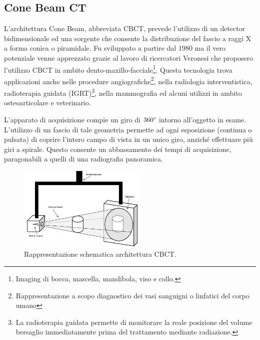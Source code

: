 \documentclass[a4paper,12pt, doubleside]{report}
\begin{document}
            \subsection{Cone Beam CT}
                \label{sec:cone-beam}
                \par
                    L'architettura Cone Beam, abbreviata CBCT, prevede l'utilizzo di un detector bidimensionale ed una sorgente che consente la distribuzione del fascio a raggi X a forma conica o piramidale. Fu sviluppato a partire dal 1980 ma il vero potenziale venne apprezzato grazie al lavoro di ricercatori Veronesi che proposero l'utilizzo CBCT in ambito dento-maxillo-facciale\footnote{Imaging di bocca, mascella, mandibola, viso e collo.}. Questa tecnologia trova applicazioni anche nelle procedure angiografiche\footnote{Rappresentazione a scopo diagnostico dei vasi sanguigni o linfatici del corpo umano}, nella radiologia interventistica, radioterapia guidata (IGRT)\footnote{La radioterapia guidata permette di monitorare la reale posizione del volume bersaglio immediatamente prima del trattamento mediante radiazione.}, nella mammografia ed alcuni utilizzi in ambito osteoarticolare e veterinario.
                
                \bigskip
                \par
                    L'apparato di acquisizione compie un giro di $360\degree$ intorno all'oggetto in esame. L'utilizzo di un fascio di tale geometria permette ad ogni esposizione (continua o pulsata) di coprire l'intero campo di vista in un unico giro, anziché effettuare più giri a spirale. Questo consente un abbassamento dei tempi di acquisizione, paragonabili a quelli di una radiografia panoramica.
                                   
                    \begin{figure}[h]
                        \centering
                        \includegraphics[width=0.55\textwidth]{cone_beam}
                        \caption{Rappresentazione schematica architettura CBCT.}
                        \label{fig:cbct}
                    \end{figure}
                    
\end{document}
